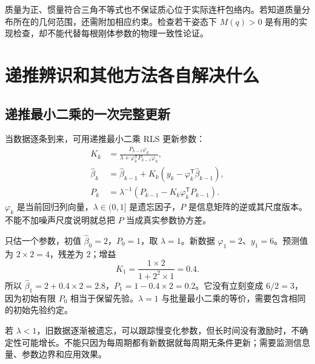 质量为正、惯量符合三角不等式也不保证质心位于实际连杆包络内。若知道质量分布所在的几何范围，还需附加相应约束。检查若干姿态下 $M(q)>0$ 是有用的实现检查，却不能代替每根刚体参数的物理一致性论证。

\section{递推辨识和其他方法各自解决什么}
\subsection{递推最小二乘的一次完整更新}
当数据逐条到来，可用递推最小二乘 RLS 更新参数：
\begin{align}
 K_k&=\frac{P_{k-1}\varphi_k}{\lambda+\varphi_k^{\mathsf T}P_{k-1}\varphi_k},\\
 \hat\beta_k&=\hat\beta_{k-1}+K_k(y_k-\varphi_k^{\mathsf T}\hat\beta_{k-1}),\\
 P_k&=\lambda^{-1}(P_{k-1}-K_k\varphi_k^{\mathsf T}P_{k-1}).
\end{align}
$\varphi_k$ 是当前回归列向量，$\lambda\in(0,1]$ 是遗忘因子，$P$ 是信息矩阵的逆或其尺度版本。不能不加噪声尺度说明就总把 $P$ 当成真实参数协方差。

\begin{examplebox}[算例 8D 一次 RLS 更新]
只估一个参数，初值 $\hat\beta_0=2$，$P_0=1$，取 $\lambda=1$。新数据 $\varphi_1=2$、$y_1=6$。预测值为 $2\times2=4$，残差为 $2$；增益
\[
 K_1=\frac{1\times2}{1+2^2\times1}=0.4.
\]
所以 $\hat\beta_1=2+0.4\times2=2.8$，$P_1=1-0.4\times2=0.2$。它没有立刻变成 $6/2=3$，因为初始有限 $P_0$ 相当于保留先验。$\lambda=1$ 与批量最小二乘的等价，需要包含相同的初始先验约定。
\end{examplebox}

若 $\lambda<1$，旧数据逐渐被遗忘，可以跟踪慢变化参数，但长时间没有激励时，不确定性可能增长。不能只因为每周期都有新数据就每周期无条件更新；需要监测信息量、参数边界和应用效果。

